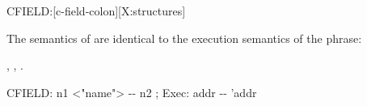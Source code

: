\begin{worddef}{}{CFIELD:}[c-field-colon][X:structures]
\item \stack{}{}

	The semantics of  are identical to the
	execution semantics of the phrase:
	\begin{quote}  
	\end{quote}

\see {},
	,
	.

	\begin{implement} %

		\word{:} CFIELD:\tab{} n1 <"name"> -{}- n2 ; Exec: addr -{}- 'addr \\
		   \\
		\word{;}
	\end{implement}
\end{worddef}


